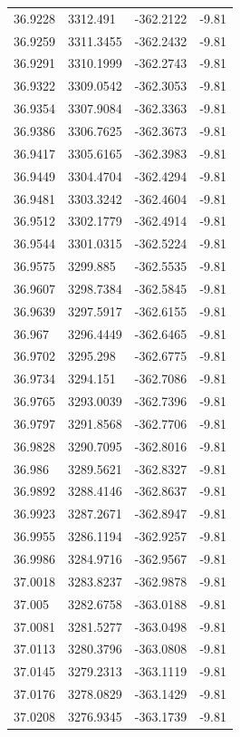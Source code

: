 \begin{table}[H]
\begin{tabular}{llll}
36.9228 & 3312.491 & -362.2122 & -9.81 \\
36.9259 & 3311.3455 & -362.2432 & -9.81 \\
36.9291 & 3310.1999 & -362.2743 & -9.81 \\
36.9322 & 3309.0542 & -362.3053 & -9.81 \\
36.9354 & 3307.9084 & -362.3363 & -9.81 \\
36.9386 & 3306.7625 & -362.3673 & -9.81 \\
36.9417 & 3305.6165 & -362.3983 & -9.81 \\
36.9449 & 3304.4704 & -362.4294 & -9.81 \\
36.9481 & 3303.3242 & -362.4604 & -9.81 \\
36.9512 & 3302.1779 & -362.4914 & -9.81 \\
36.9544 & 3301.0315 & -362.5224 & -9.81 \\
36.9575 & 3299.885 & -362.5535 & -9.81 \\
36.9607 & 3298.7384 & -362.5845 & -9.81 \\
36.9639 & 3297.5917 & -362.6155 & -9.81 \\
36.967 & 3296.4449 & -362.6465 & -9.81 \\
36.9702 & 3295.298 & -362.6775 & -9.81 \\
36.9734 & 3294.151 & -362.7086 & -9.81 \\
36.9765 & 3293.0039 & -362.7396 & -9.81 \\
36.9797 & 3291.8568 & -362.7706 & -9.81 \\
36.9828 & 3290.7095 & -362.8016 & -9.81 \\
36.986 & 3289.5621 & -362.8327 & -9.81 \\
36.9892 & 3288.4146 & -362.8637 & -9.81 \\
36.9923 & 3287.2671 & -362.8947 & -9.81 \\
36.9955 & 3286.1194 & -362.9257 & -9.81 \\
36.9986 & 3284.9716 & -362.9567 & -9.81 \\
37.0018 & 3283.8237 & -362.9878 & -9.81 \\
37.005 & 3282.6758 & -363.0188 & -9.81 \\
37.0081 & 3281.5277 & -363.0498 & -9.81 \\
37.0113 & 3280.3796 & -363.0808 & -9.81 \\
37.0145 & 3279.2313 & -363.1119 & -9.81 \\
37.0176 & 3278.0829 & -363.1429 & -9.81 \\
37.0208 & 3276.9345 & -363.1739 & -9.81 \\

\end{tabular}
\end{table}
